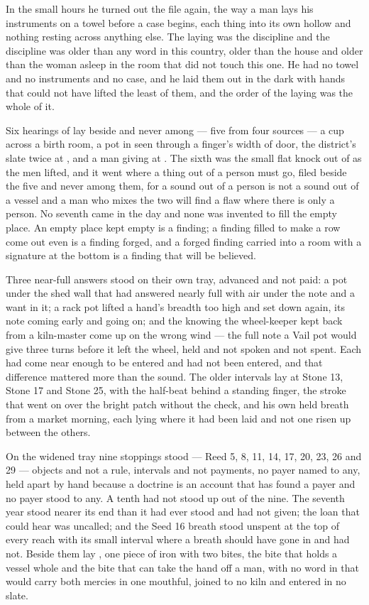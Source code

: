 \scenebreak

In the small hours he turned out the file again, the way a man lays his instruments on a towel before a case begins, each thing into its own hollow and nothing resting across anything else. The laying was the discipline and the discipline was older than any word in this country, older than the house and older than the woman asleep in the room that did not touch this one. He had no towel and no instruments and no case, and he laid them out in the dark with hands that could not have lifted the least of them, and the order of the laying was the whole of it.

Six hearings of  lay beside and never among --- five from four sources --- a cup across a birth room, a pot in  seen through a finger's width of door, the district's slate twice at , and a man giving at . The sixth was the small flat knock out of  as the men lifted, and it went where a thing out of a person must go, filed beside the five and never among them, for a sound out of a person is not a sound out of a vessel and a man who mixes the two will find a flaw where there is only a person. No seventh came in the day and none was invented to fill the empty place. An empty place kept empty is a finding; a finding filled to make a row come out even is a finding forged, and a forged finding carried into a room with a signature at the bottom is a finding that will be believed.

Three near-full answers stood on their own tray, advanced and not paid: a pot under the shed wall that had answered nearly full with air under the note and a want in it; a rack pot lifted a hand's breadth too high and set down again, its note coming early and going on; and the knowing the wheel-keeper kept back from a kiln-master come up on the wrong wind --- the full note a Vail pot would give three turns before it left the wheel, held and not spoken and not spent. Each had come near enough to be entered and had not been entered, and that difference mattered more than the sound. The older intervals lay at Stone 13, Stone 17 and Stone 25, with the half-beat behind a standing finger, the stroke that went on over the bright patch without the check, and his own held breath from a market morning, each lying where it had been laid and not one risen up between the others.

On the widened tray nine stoppings stood --- Reed 5, 8, 11, 14, 17, 20, 23, 26 and 29 --- objects and not a rule, intervals and not payments, no payer named to any, held apart by hand because a doctrine is an account that has found a payer and no payer stood to any. A tenth had not stood up out of the nine. The seventh year stood nearer its end than it had ever stood and had not given; the loan that could hear was uncalled; and the Seed 16 breath stood unspent at the top of every reach with its small interval where a breath should have gone in and had not. Beside them lay , one piece of iron with two bites, the bite that holds a vessel whole and the bite that can take the hand off a man, with no word in  that would carry both mercies in one mouthful, joined to no kiln and entered in no slate.

